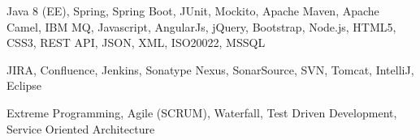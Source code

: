 \medskip
\begin{description}
	\ifincludestech
	\item [Technologies] Java 8 (EE), Spring, Spring Boot, JUnit, Mockito, Apache Maven, Apache Camel, IBM MQ, Javascript, AngularJs, jQuery, Bootstrap, Node.js, HTML5, CSS3, REST API, JSON, XML, ISO20022, MSSQL
	\fi
	\ifincludestools
	\item [Tools] JIRA, Confluence, Jenkins, Sonatype Nexus, SonarSource, SVN, Tomcat, IntelliJ, Eclipse
	\fi
	\ifincludesmethods
	\item [Methodologies] Extreme Programming, Agile (SCRUM), Waterfall, Test Driven Development, Service Oriented Architecture
	\fi
\end{description}
